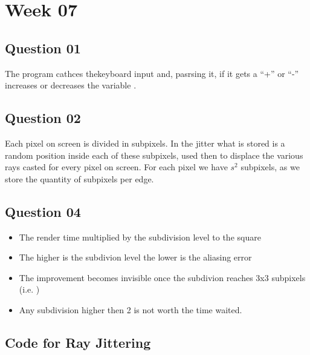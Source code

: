 \chapter{Week 07}

  \section{Question 01}
    
    The program cathces thekeyboard input and, pasrsing it, if it gets a ``+'' or ``-'' increases or decreases the
    variable .

  \section{Question 02}

    Each pixel on screen is divided in subpixels. In the jitter what is stored is a random position inside each of these
    subpixels, used then to displace the various rays casted for every pixel on screen. For each pixel we have $s^2$
    subpixels, as we store the quantity of subpixels per edge.

  \section{Question 04}

    \begin{itemize}
      \item The render time multiplied by the subdivision level to the square
      \item The higher is the subdivion level the lower is the aliasing error
      \item The improvement becomes invisible once the subdivion reaches 3x3 subpixels (i.e. )
      \item Any subdivision higher then 2 is not worth the time waited.
    \end{itemize}

  \section{Code for Ray Jittering}
    
